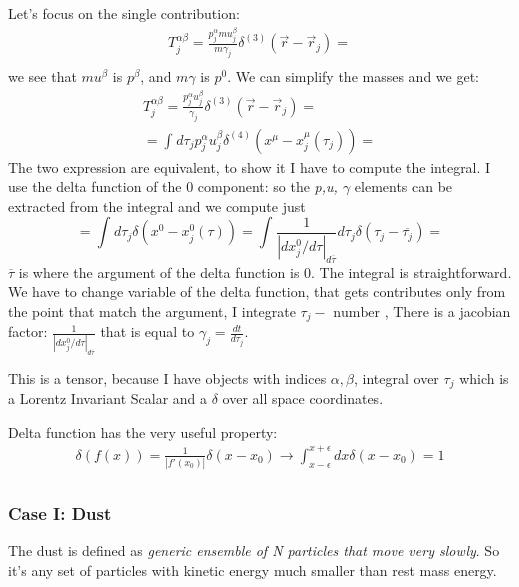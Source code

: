 Let's focus on the single contribution:
\begin{gather*}
T^{\alpha \beta }_{j} = \frac{p^{\alpha }_{j} m u^{\beta }_{j}}{m \gamma_{j}} \delta^{\left( 3 \right)}\left( \vec{r}-\vec{r}_{j} \right) =\\
\end{gather*}
we see that $m u^{\beta }$ is $p^{\beta }$, and $m \gamma $ is $p^{0}$. We can simplify the masses and we get:
\begin{gather*}
T^{\alpha \beta }_{j} = \frac{p^{\alpha }_{j} u^{\beta }_{j}}{ \gamma_{j}} \delta^{\left( 3 \right)}\left( \vec{r}-\vec{r}_{j} \right) =\\
= \int_{}^{}{d\tau_{j} p^{\alpha }_{j} u^{\beta }_{j} \delta^{\left( 4 \right)}\left( x^{\mu }-x^{\mu }_{j}\left( \tau_{j} \right) \right)} =
\end{gather*}
The two expression are equivalent, to show it I have to compute the integral. I use the delta function of the 0 component: so the \emph{p,u, $\gamma $} elements can be extracted from the integral and we compute just
\begin{equation}
	= \int_{}^{}{d\tau_{j} \delta\left( x^{0}-x^{0}_{j}\left( \tau  \right) \right)} = \int_{}^{}{\frac{1}{\left| dx^{0}_{j}/d\tau \right|_{d\overline{\tau }}} d\tau_{j} \delta\left( \tau_{j}-\overline{\tau_{j}} \right)}= 
\end{equation}
$\overline{\tau }$ is where the argument of the delta function is 0. The integral is straightforward. We have to change variable of the delta function, that gets contributes only from the point that match the argument, I integrate $\tau_{j} - \text{ number }$, There is a jacobian factor: $\frac{1}{\left| dx^{0}_{j}/d\tau \right|_{d\overline{\tau }}}$ that is equal to $\gamma_{j} = \frac{dt}{d\tau_{j}}$.

This is a tensor, because I have objects with indices $\alpha, \beta $, integral over $\tau_{j}$ which is a Lorentz Invariant Scalar and a $\delta $ over all space coordinates.

Delta function has the very useful property:
\begin{gather*}
\delta\left( f\left( x \right) \right) = \frac{1}{\left| f'\left( x_{0} \right)\right|} \delta\left( x-x_{0} \right) \to \int_{x-\epsilon }^{x+\epsilon }{dx \delta \left( x-x_{0} \right)}=1\\
\end{gather*}

\subsubsection{Case I: Dust}
The dust is defined as \emph{generic ensemble of N particles that move very slowly}. So it's any set of particles with kinetic energy much smaller than rest mass energy.

